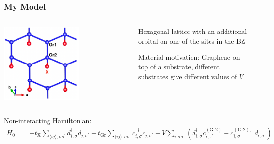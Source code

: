 \documentclass[aspectratio=169]{beamer}
\begin{document}
\begin{frame}
	\frametitle{My Model}
	
	\begin{columns}
		\begin{column}{0.5\textwidth}
			\begin{center}
				\includegraphics[width=0.6\textwidth]{figs/EG-X structure}
			\end{center}
		\end{column}
		\begin{column}{0.5\textwidth}
			Hexagonal lattice with an additional orbital on one of the sites in the BZ
			
			Material motivation: Graphene on top of a substrate, different substrates give different values of \(V\)
		\end{column}
	\end{columns}
	
	Non-interacting Hamiltonian:
	\begin{align}
		H_0 &= -t_{\mathrm{X}} \sum_{\langle ij \rangle, \sigma \sigma^{\prime}} d_{i, \sigma}^{\dagger} d_{j, \sigma^{\prime}}
		-t_{\mathrm{Gr}} \sum_{\langle ij \rangle, \sigma \sigma^{\prime}}
		c_{i, \sigma}^{, \dagger} c_{j, \sigma^{\prime}}
		+ V \sum_{i, \sigma \sigma^{\prime}} \left(
		d_{i, \sigma}^{\dagger} c_{i, \sigma^{\prime}}^{(\textrm{Gr2})} +
		c_{i, \sigma}^{(\textrm{Gr2}), \dagger} d_{i, \sigma^{\prime}}
		\right)
		\label{eq:EG-X model Hamiltonian non-interacting}
	\end{align}
\end{frame}
\end{document}
